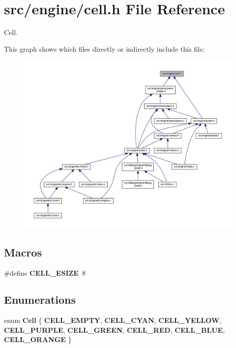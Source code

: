 \section{src/engine/cell.h File Reference}
\label{cell_8h}


Cell.  


This graph shows which files directly or indirectly include this file\+:
\nopagebreak
\begin{figure}[H]
\begin{center}
\leavevmode
\includegraphics[width=350pt]{cell_8h__dep__incl}
\end{center}
\end{figure}
\subsection*{Macros}
\begin{DoxyCompactItemize}
\item 
\#define \textbf{ C\+E\+L\+L\+\_\+\+E\+S\+I\+ZE}~8
\end{DoxyCompactItemize}
\subsection*{Enumerations}
\begin{DoxyCompactItemize}
\item 
enum \textbf{ Cell} \{ \newline
\textbf{ C\+E\+L\+L\+\_\+\+E\+M\+P\+TY}, 
\textbf{ C\+E\+L\+L\+\_\+\+C\+Y\+AN}, 
\textbf{ C\+E\+L\+L\+\_\+\+Y\+E\+L\+L\+OW}, 
\textbf{ C\+E\+L\+L\+\_\+\+P\+U\+R\+P\+LE}, 
\newline
\textbf{ C\+E\+L\+L\+\_\+\+G\+R\+E\+EN}, 
\textbf{ C\+E\+L\+L\+\_\+\+R\+ED}, 
\textbf{ C\+E\+L\+L\+\_\+\+B\+L\+UE}, 
\textbf{ C\+E\+L\+L\+\_\+\+O\+R\+A\+N\+GE}
 \}
\end{DoxyCompactItemize}


